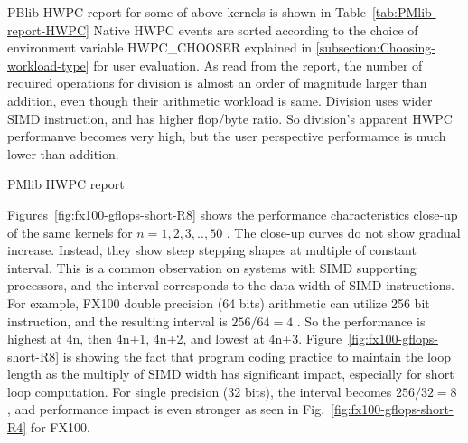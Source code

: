 \documentclass[conference]{IEEEtran}
\begin{document}
PBlib HWPC report for some of above kernels is shown in
Table~\ref{tab:PMlib-report-HWPC}
Native HWPC events are sorted according to the choice of
environment variable HWPC\_CHOOSER explained in
\ref{subsection:Choosing-workload-type}
for user evaluation.
As read from the report,
the number of required operations for division is almost an order of magnitude
larger than addition, even though their arithmetic workload is same.
Division uses wider SIMD instruction, and has higher flop/byte ratio.
So division's apparent HWPC performanve becomes very high,
but the user perspective performamce is much lower than addition.
\begin{table}[tb]
\scriptsize
\caption{PMlib HWPC report}
\label{tab:PMlib-report-HWPC}
\footnotesize

\end{table}

%	
%
%


Figures~\ref{fig:fx100-gflops-short-R8}
shows the performance characteristics close-up of the same kernels for
\begin{math}
n=1,2,3,..,50
\end{math}
.
The close-up curves do not show gradual increase. Instead, they
show steep stepping shapes at multiple of constant interval.
This is a common observation on systems with SIMD supporting processors,
and the interval corresponds to the data width of SIMD instructions.
For example, FX100 double precision (64 bits) arithmetic can utilize
256 bit instruction, and the resulting interval is
\begin{math}
256 / 64 = 4
\end{math}
.
So the performance is highest at 4n, then 4n+1, 4n+2, and lowest at 4n+3.
Figure~\ref{fig:fx100-gflops-short-R8} is showing the fact that
program coding practice to maintain the loop length as the multiply of
SIMD width has significant impact, especially for short loop computation.
For single precision (32 bits), the interval becomes
\begin{math}
256 / 32 = 8
\end{math}
, and performance impact is even stronger as seen in
Fig.~\ref{fig:fx100-gflops-short-R4} for FX100.
\end{document}

